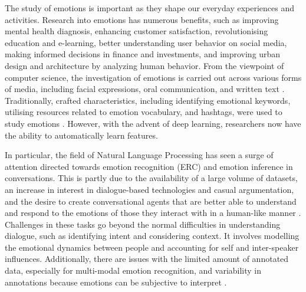 The study of emotions is important as they shape our everyday experiences and activities. Research into emotions has numerous benefits, such as improving mental health diagnosis, enhancing customer satisfaction, revolutionising education and e-learning, better understanding user behavior on social media, making informed decisions in finance and investments, and improving urban design and architecture by analyzing human behavior. From the viewpoint of computer science, the investigation of emotions is carried out across various forms of media, including facial expressions, oral communication, and written text \cite{Li2018DeepFE,Drakopoulos2019EmotionRF,Marchal2019SurveyOA, 10.1145/3136755.3136801}. Traditionally, crafted characteristics, including identifying emotional keywords, utilising resources related to emotion vocabulary, and hashtags, were used to study emotions \cite{Strapparava2004WordNetAA, Wang2012HarnessingT}. However, with the advent of deep learning, researchers now have the ability to automatically learn features. 

In particular, the field of Natural Language Processing has seen a surge of attention directed towards emotion recognition (ERC) and emotion inference in conversations. This is partly due to the availability of a large volume of datasets, an increase in interest in dialogue-based technologies and casual argumentation, and the desire to create conversational agents that are better able to understand and respond to the emotions of those they interact with in a human-like manner \cite{Liu2021LifelongAC,Bowman2015ALA, Tu2021ExplorationME}. Challenges in these tasks go beyond the normal difficulties in understanding dialogue, such as identifying intent and considering context. It involves modelling the emotional dynamics between people and accounting for self and inter-speaker influences. Additionally, there are issues with the limited amount of annotated data, especially for multi-modal emotion recognition, and variability in annotations because emotions can be subjective to interpret \cite{Chen2017ASO,hazarika-etal-2018-icon,Hazarika2019ConversationalTL,Poria2020BeneathTT}.

